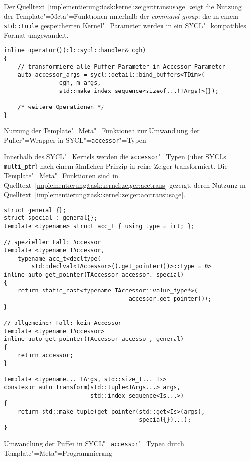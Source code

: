 Der Quelltext~\ref{implementierung:task:kernel:zeiger:transusage} zeigt die
Nutzung der Template"=Meta"=Funktionen innerhalb der \textit{command group}:
die in einem \texttt{std::tuple} gespeicherten Kernel"=Parameter werden in ein
SYCL"=kompatibles Format umgewandelt.

\begin{code}
    \begin{verbatim}
inline operator()(cl::sycl::handler& cgh)
{
    // transformiere alle Puffer-Parameter in Accessor-Parameter
    auto accessor_args = sycl::detail::bind_buffers<TDim>(
                cgh, m_args,
                std::make_index_sequence<sizeof...(TArgs)>{});

    /* weitere Operationen */
}
    \end{verbatim}
    \caption{Nutzung der Template"=Meta"=Funktionen zur Umwandlung der
             Puffer"=Wrapper in SYCL"=\texttt{accessor}"=Typen}
    \label{implementierung:task:kernel:zeiger:transusage}
\end{code}

Innerhalb des SYCL"=Kernels werden die \texttt{accessor}"=Typen (über SYCLs
\texttt{multi\_ptr}) nach einem ähnlichen Prinzip in reine Zeiger transformiert.
Die Template"=Meta"=Funktionen sind in
Quelltext~\ref{implementierung:task:kernel:zeiger:acctrans} gezeigt, deren
Nutzung in Quelltext~\ref{implementierung:task:kernel:zeiger:acctransusage}.

\begin{code}
    \begin{verbatim}
struct general {};
struct special : general{};
template <typename> struct acc_t { using type = int; };

// spezieller Fall: Accessor
template <typename TAccessor,
    typename acc_t<decltype(
        std::declval<TAccessor>().get_pointer())>::type = 0>
inline auto get_pointer(TAccessor accessor, special)
{
    return static_cast<typename TAccessor::value_type*>(
                                    accessor.get_pointer());
}

// allgemeiner Fall: kein Accessor
template <typename TAccessor>
inline auto get_pointer(TAccessor accessor, general)
{
    return accessor;
}

template <typename... TArgs, std::size_t... Is>
constexpr auto transform(std::tuple<TArgs...> args,
                         std::index_sequence<Is...>)
{
    return std::make_tuple(get_pointer(std::get<Is>(args),
                                       special{})...);
}
    \end{verbatim}
    \caption{Umwandlung der Puffer in SYCL"=\texttt{accessor}"=Typen durch
             Template"=Meta"=Programmierung}
    \label{implementierung:task:kernel:zeiger:acctrans}
\end{code}


